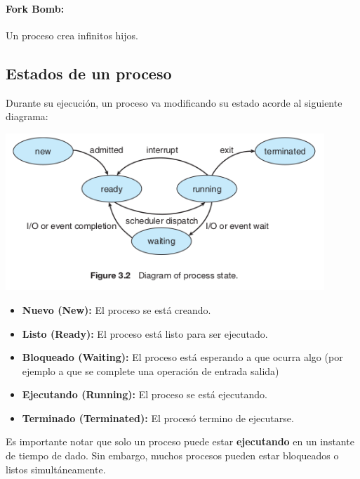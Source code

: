 \paragraph{Fork Bomb:} Un proceso crea infinitos hijos.
\subsection{Estados de un proceso}\label{procesos::estados}
Durante su ejecución, un proceso va modificando su estado acorde al siguiente diagrama:

\begin{center}
	\vspace*{0.5cm}
	\includegraphics[width=0.9\textwidth]{imagenes/estados-proceso.png}
\end{center}

\begin{itemize}
	\item \textbf{Nuevo (New):} El proceso se está creando.
	\item \textbf{Listo (Ready):} El proceso está listo para ser ejecutado.
	\item \textbf{Bloqueado (Waiting):} El proceso está esperando a que ocurra algo (por ejemplo a que se complete una operación de entrada salida)
	\item \textbf{Ejecutando (Running):} El proceso se está ejecutando.
	\item \textbf{Terminado (Terminated):} El procesó termino de ejecutarse.
\end{itemize}

Es importante notar que solo un proceso puede estar \textbf{ejecutando} en un instante de tiempo de dado. Sin embargo, muchos procesos pueden estar bloqueados o listos simultáneamente.

